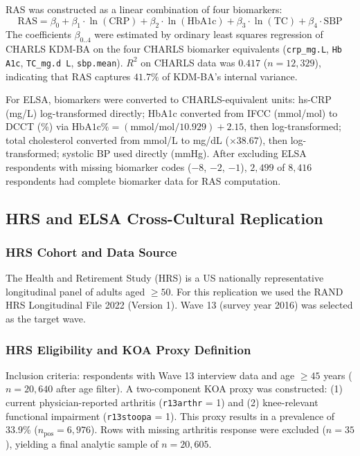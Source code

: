 \documentclass[11pt,a4paper]{article}
\begin{document}
RAS was constructed as a linear combination of four biomarkers:
\[
\text{RAS} = \beta_0 + \beta_1 \cdot \ln(\text{CRP}) + \beta_2 \cdot \ln(\text{HbA1c})
           + \beta_3 \cdot \ln(\text{TC}) + \beta_4 \cdot \text{SBP}
\]
The coefficients $\beta_{0..4}$ were estimated by ordinary least squares regression of
CHARLS KDM-BA on the four CHARLS biomarker equivalents
(\texttt{crp\_mg.L}, \texttt{Hb A1c}, \texttt{TC\_mg.d L}, \texttt{sbp.mean}).
$R^2$ on CHARLS data was $0.417$ ($n=12{,}329$), indicating that RAS captures
$41.7\%$ of KDM-BA's internal variance.

For ELSA, biomarkers were converted to CHARLS-equivalent units: hs-CRP (mg/L)
log-transformed directly; HbA1c converted from IFCC (mmol/mol) to DCCT (\%) via
$\text{HbA1c}\% = (\text{mmol/mol} / 10.929) + 2.15$, then log-transformed; total
cholesterol converted from mmol/L to mg/dL ($\times 38.67$), then log-transformed;
systolic BP used directly (mmHg). After excluding ELSA respondents with missing
biomarker codes ($-8$, $-2$, $-1$), $2{,}499$ of $8{,}416$ respondents had complete
biomarker data for RAS computation.

\subsection{HRS and ELSA Cross-Cultural Replication}

\subsubsection*{HRS Cohort and Data Source}
The Health and Retirement Study (HRS)\cite{HRS2023} is a US nationally representative longitudinal
panel of adults aged $\geq 50$. For this replication we used the RAND HRS Longitudinal File 2022
(Version 1)\cite{RAND2023}. Wave 13 (survey year 2016) was selected as the target wave.

\subsubsection*{HRS Eligibility and KOA Proxy Definition}
Inclusion criteria: respondents with Wave 13 interview data and age $\geq 45$ years
($n=20{,}640$ after age filter). A two-component KOA proxy was constructed:
(1) current physician-reported arthritis (\texttt{r13arthr} = 1) and
(2) knee-relevant functional impairment (\texttt{r13stoopa} = 1).
This proxy results in a prevalence of 33.9\% ($n_{\text{pos}}=6{,}976$). Rows with missing
arthritis response were excluded ($n=35$), yielding a final analytic sample of $n=20{,}605$.
\end{document}
